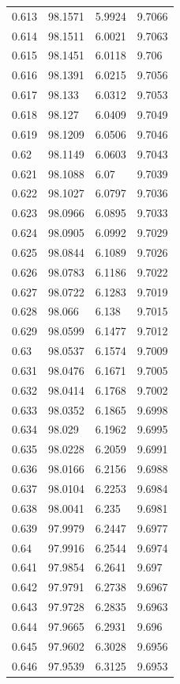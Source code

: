 \begin{tabular}{llll}
0.613 & 98.1571 & 5.9924 & 9.7066 \\
0.614 & 98.1511 & 6.0021 & 9.7063 \\
0.615 & 98.1451 & 6.0118 & 9.706 \\
0.616 & 98.1391 & 6.0215 & 9.7056 \\
0.617 & 98.133 & 6.0312 & 9.7053 \\
0.618 & 98.127 & 6.0409 & 9.7049 \\
0.619 & 98.1209 & 6.0506 & 9.7046 \\
0.62 & 98.1149 & 6.0603 & 9.7043 \\
0.621 & 98.1088 & 6.07 & 9.7039 \\
0.622 & 98.1027 & 6.0797 & 9.7036 \\
0.623 & 98.0966 & 6.0895 & 9.7033 \\
0.624 & 98.0905 & 6.0992 & 9.7029 \\
0.625 & 98.0844 & 6.1089 & 9.7026 \\
0.626 & 98.0783 & 6.1186 & 9.7022 \\
0.627 & 98.0722 & 6.1283 & 9.7019 \\
0.628 & 98.066 & 6.138 & 9.7015 \\
0.629 & 98.0599 & 6.1477 & 9.7012 \\
0.63 & 98.0537 & 6.1574 & 9.7009 \\
0.631 & 98.0476 & 6.1671 & 9.7005 \\
0.632 & 98.0414 & 6.1768 & 9.7002 \\
0.633 & 98.0352 & 6.1865 & 9.6998 \\
0.634 & 98.029 & 6.1962 & 9.6995 \\
0.635 & 98.0228 & 6.2059 & 9.6991 \\
0.636 & 98.0166 & 6.2156 & 9.6988 \\
0.637 & 98.0104 & 6.2253 & 9.6984 \\
0.638 & 98.0041 & 6.235 & 9.6981 \\
0.639 & 97.9979 & 6.2447 & 9.6977 \\
0.64 & 97.9916 & 6.2544 & 9.6974 \\
0.641 & 97.9854 & 6.2641 & 9.697 \\
0.642 & 97.9791 & 6.2738 & 9.6967 \\
0.643 & 97.9728 & 6.2835 & 9.6963 \\
0.644 & 97.9665 & 6.2931 & 9.696 \\
0.645 & 97.9602 & 6.3028 & 9.6956 \\
0.646 & 97.9539 & 6.3125 & 9.6953 \\

\end{tabular}
